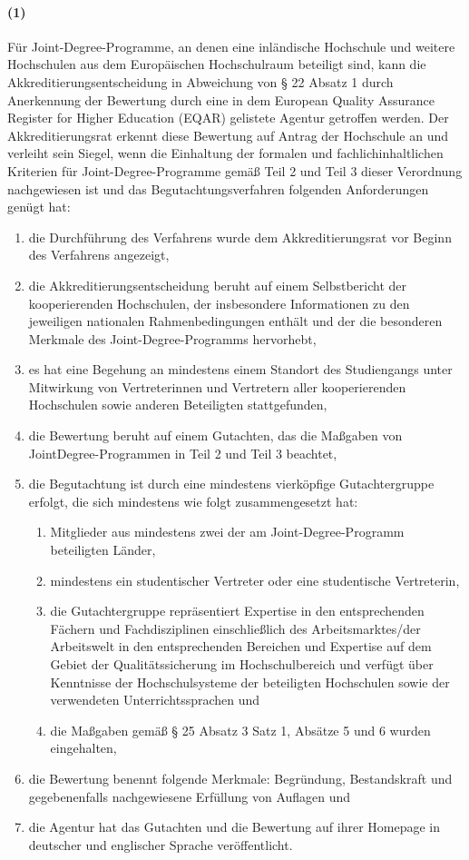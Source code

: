 \documentclass[a4paper]{scrartcl}
\begin{document}
\paragraph{(1)} Für Joint-Degree-Programme, an denen eine inländische Hochschule und weitere Hochschulen aus dem Europäischen Hochschulraum beteiligt sind, kann die Akkreditierungsentscheidung in Abweichung von § 22 Absatz 1 durch Anerkennung der Bewertung durch eine in dem European Quality Assurance Register for Higher Education (EQAR) gelistete Agentur getroffen werden. Der Akkreditierungsrat erkennt diese Bewertung auf Antrag der Hochschule an und verleiht sein Siegel, wenn die Einhaltung der formalen und fachlichinhaltlichen Kriterien für Joint-Degree-Programme gemäß Teil 2 und Teil 3 dieser Verordnung nachgewiesen ist und das Begutachtungsverfahren folgenden Anforderungen genügt hat:
\begin{enumerate}
\item die Durchführung des Verfahrens wurde dem Akkreditierungsrat vor Beginn des Verfahrens angezeigt,
\item die Akkreditierungsentscheidung beruht auf einem Selbstbericht der kooperierenden Hochschulen, der insbesondere Informationen zu den jeweiligen nationalen Rahmenbedingungen enthält und der die besonderen Merkmale des Joint-Degree-Programms hervorhebt,
\item es hat eine Begehung an mindestens einem Standort des Studiengangs unter Mitwirkung von Vertreterinnen und Vertretern aller kooperierenden Hochschulen sowie anderen Beteiligten stattgefunden,
\item die Bewertung beruht auf einem Gutachten, das die Maßgaben von JointDegree-Programmen in Teil 2 und Teil 3 beachtet,
\item die Begutachtung ist durch eine mindestens vierköpfige Gutachtergruppe erfolgt, die sich mindestens wie folgt zusammengesetzt hat:
\begin{enumerate}[label=\alph*]
\item Mitglieder aus mindestens zwei der am Joint-Degree-Programm
beteiligten Länder,
\item mindestens ein studentischer Vertreter oder eine studentische
Vertreterin,
\item die Gutachtergruppe repräsentiert Expertise in den entsprechenden Fächern und Fachdisziplinen einschließlich des Arbeitsmarktes/der Arbeitswelt in den entsprechenden Bereichen und Expertise auf dem Gebiet der Qualitätssicherung im Hochschulbereich und verfügt über Kenntnisse der Hochschulsysteme der beteiligten Hochschulen sowie der verwendeten Unterrichtssprachen und
\item die Maßgaben gemäß § 25 Absatz 3 Satz 1, Absätze 5 und 6 wurden
eingehalten,
\end{enumerate}
\item die Bewertung benennt folgende Merkmale: Begründung, Bestandskraft und gegebenenfalls nachgewiesene Erfüllung von Auflagen und
\item die Agentur hat das Gutachten und die Bewertung auf ihrer Homepage in deutscher und englischer Sprache veröffentlicht.
\end{enumerate}
\end{document}

